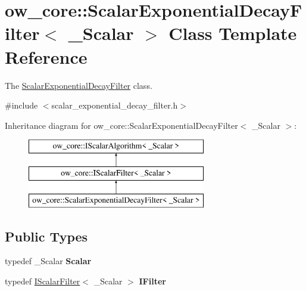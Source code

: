 \hypertarget{classow__core_1_1ScalarExponentialDecayFilter}{}\section{ow\+\_\+core\+:\+:Scalar\+Exponential\+Decay\+Filter$<$ \+\_\+\+Scalar $>$ Class Template Reference}
\label{classow__core_1_1ScalarExponentialDecayFilter}


The \hyperlink{classow__core_1_1ScalarExponentialDecayFilter}{Scalar\+Exponential\+Decay\+Filter} class.  




{\ttfamily \#include $<$scalar\+\_\+exponential\+\_\+decay\+\_\+filter.\+h$>$}

Inheritance diagram for ow\+\_\+core\+:\+:Scalar\+Exponential\+Decay\+Filter$<$ \+\_\+\+Scalar $>$\+:\begin{figure}[H]
\begin{center}
\leavevmode
\includegraphics[height=3.000000cm]{da/d39/classow__core_1_1ScalarExponentialDecayFilter}
\end{center}
\end{figure}
\subsection*{Public Types}
\begin{DoxyCompactItemize}
\item 
typedef \+\_\+\+Scalar {\bfseries Scalar}\hypertarget{classow__core_1_1ScalarExponentialDecayFilter_ad8b991095b6882437f695435189fccfd}{}\label{classow__core_1_1ScalarExponentialDecayFilter_ad8b991095b6882437f695435189fccfd}

\item 
typedef \hyperlink{classow__core_1_1IScalarFilter}{I\+Scalar\+Filter}$<$ \+\_\+\+Scalar $>$ {\bfseries I\+Filter}\hypertarget{classow__core_1_1ScalarExponentialDecayFilter_af881cb1ae956f3537b8653b66bdfe0ea}{}\label{classow__core_1_1ScalarExponentialDecayFilter_af881cb1ae956f3537b8653b66bdfe0ea}

\end{DoxyCompactItemize}
